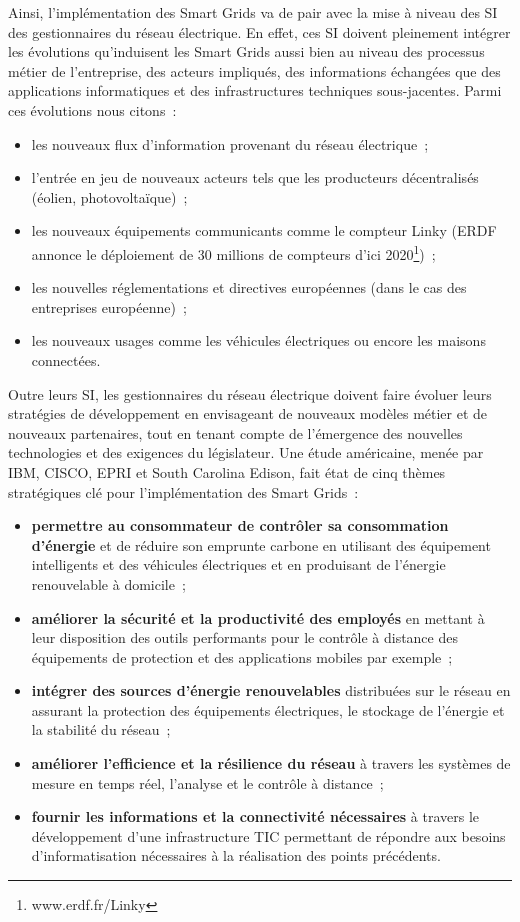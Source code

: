 Ainsi, l'implémentation des Smart Grids va de pair avec la mise à niveau des SI 
des gestionnaires du réseau électrique. En effet, ces SI doivent pleinement 
intégrer les évolutions qu'induisent les Smart Grids aussi bien au niveau des 
processus métier de l'entreprise, des acteurs impliqués, des informations 
échangées que des applications informatiques et des infrastructures techniques 
sous-jacentes. Parmi ces évolutions nous citons~:
\begin{itemize}
\item les nouveaux flux d'information provenant du réseau électrique~;
\item l'entrée en jeu de nouveaux acteurs tels que les producteurs décentralisés 
(éolien, photovoltaïque)~;
\item les nouveaux équipements communicants comme le compteur Linky (ERDF 
annonce le déploiement de 30 millions de compteurs d'ici 
2020\footnote{www.erdf.fr/Linky})~;
\item les nouvelles réglementations et directives européennes (dans le cas des 
entreprises européenne)~;
\item les nouveaux usages comme les véhicules électriques ou encore les maisons 
connectées.
\end{itemize}

Outre leurs SI, les gestionnaires du réseau électrique doivent faire évoluer 
leurs stratégies de développement en envisageant de nouveaux modèles métier et 
de nouveaux partenaires, tout en tenant compte de l'émergence des nouvelles 
technologies et des exigences du législateur. Une étude américaine, menée par 
IBM, CISCO, EPRI et South Carolina Edison, fait état de cinq thèmes stratégiques 
clé pour l'implémentation des Smart Grids~:
\begin{itemize}
\item \textbf{permettre au consommateur de contrôler sa consommation d'énergie} 
et de réduire son emprunte carbone en utilisant des équipement intelligents et 
des véhicules électriques et en produisant de l'énergie renouvelable à 
domicile~;
\item \textbf{améliorer la sécurité et la productivité des employés} en mettant 
à leur disposition des outils performants pour le contrôle à distance des 
équipements de protection et des applications mobiles par exemple~;
\item \textbf{intégrer des sources d'énergie renouvelables} distribuées sur le 
réseau en assurant la protection des équipements électriques, le stockage de 
l'énergie et la stabilité du réseau~;
\item \textbf{améliorer l'efficience et la résilience du réseau} à travers les 
systèmes de mesure en temps réel, l'analyse et le contrôle à distance~;
\item \textbf{fournir les informations et la connectivité nécessaires} à travers 
le développement d'une infrastructure TIC permettant de répondre aux besoins 
d'informatisation nécessaires à la réalisation des points précédents.
\end{itemize}

